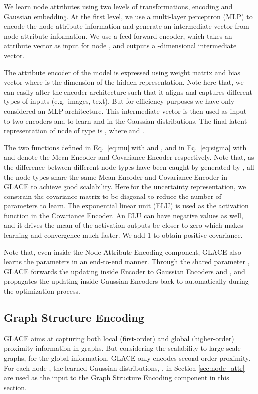 \documentclass[runningheads]{llncs}
\begin{document}
We learn node attributes using two levels of transformations, encoding and Gaussian embedding. 
At the first level, we use a multi-layer perceptron (MLP) to encode the node attribute information and generate an intermediate vector from node attribute information. 
We use a feed-forward encoder,  which takes an attribute vector  as input for node , and outputs a -dimensional intermediate vector.
\useshortskip

The attribute encoder of the model is expressed using weight matrix  and bias vector  where  is the dimension of the hidden representation. 
Note here that, we can easily alter the encoder architecture such that it aligns and captures different types of inputs (e.g.\ images, text).
But for efficiency purposes we have only considered an MLP architecture. 
This intermediate vector  is then used as input to two encoders  and  to learn  and  in the Gaussian distributions. 
The final latent representation of node  of type  is , where  and .
{\small
  
}

The two functions defined in Eq.~\ref{eq:mu} with  and , and in Eq.~\ref{eq:sigma} with  and  denote the Mean Encoder and Covariance Encoder respectively. Note that, as the difference between different node types have been caught by  generated by , all the node types share the same Mean Encoder and Covariance Encoder in GLACE to achieve good scalability.  
Here for the uncertainty representation, we constrain the covariance matrix to be diagonal to reduce the number of parameters to learn. The exponential linear unit (ELU) 
is used as the activation function in the Covariance Encoder. An ELU can have negative values as well, and it drives the mean of the activation outputs be closer to zero which makes learning and convergence much faster. We add 1 to obtain positive covariance. 

Note that, even inside the Node Attribute Encoding component, GLACE also learns the parameters in an end-to-end manner. Through the shared parameter , GLACE forwards the updating inside Encoder  to Gaussian Encoders  and , and propagates the updating inside Gaussian Encoders back to  automatically during the optimization process. 

\subsection{Graph Structure Encoding}
\label{sec:graph_struct}

GLACE aims at capturing both local (first-order) and global (higher-order) proximity information in graphs. But considering the scalability to large-scale graphs, for the global information, GLACE only encodes second-order proximity. For each node , the learned Gaussian distributions, , in Section \ref{sec:node_attr} are used as the input to the Graph Structure Encoding component in this section.  
\end{document}

